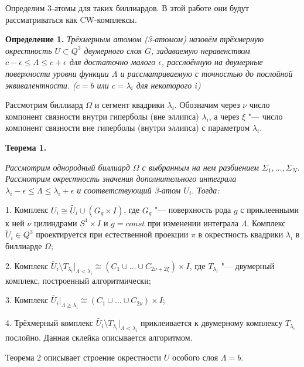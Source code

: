 Определим 3-атомы для таких биллиардов. В этой работе они будут рассматриваться как CW-комплексы.

\textbf{Определение 1.} { \it Трёхмерным атомом (3-атомом) назо\-вём трёхмерную окрестность $U \subset Q^3$ двумерного слоя $G$, зада\-ваемую неравенством $c - \epsilon \leq \Lambda \leq c + \epsilon$ для достаточно малого $\epsilon$, расслоённую на двумерные поверхности уровни функции $\Lambda$ и рассматриваемую с точностью до послойной экви\-вален\-тности. ($c = b$ или $c = \lambda_i$ для некоторого $i$)}

Рассмотрим биллиард $\Omega$ и сегмент квадрики $\lambda_i$. Обоз\-начим через $\nu$ число компонент связности внутри гиперболы (вне эллипса) $\lambda_i$, а через $\xi$ "--- число компонент связности вне гиперболы (внутри эллипса) с параметром $\lambda_i$.

\textbf{Теорема 1.}
	{\it Рассмотрим однородный биллиард $\Omega$ с выб\-ран\-ным на нем разбиением $\Sigma_1, \ldots, \Sigma_N$. Рассмотрим окрест\-ность значения дополнительного интеграла $\lambda_i - \epsilon \leq \Lambda \leq \lambda_i + \epsilon$ и соответствующий 3-атом $U_i$. Тогда:

	1. Комплекс $U_i \cong \tilde{U_i} \cup (G_g \times I)$, где $G_g$ "--- поверхность рода $g$ с приклеенными к ней $\nu$ цилиндрами $S^1 \times I$ и $g = const$ при изменении интеграла $\Lambda$. Комплекс $\tilde U_i \in Q^3$ проектируется при естественной проекции $\pi$ в окрестность квадрики $\lambda_i$ в биллиарде $\Omega$;

	2. Комплекс $\tilde{U_i} \setminus T_{\lambda_i} |_{\Lambda < \lambda_i} \cong (C_1 \cup \ldots \cup C_{2\nu+2\xi}) \times I$, где $T_{\lambda_i} $ "--- двумерный комплекс, построенный алгорит\-мически;

	3. Комплекс $\tilde{U_i} |_{\Lambda \geq \lambda_i} \cong (C_1 \cup \ldots \cup C_{2\nu}) \times I$;

	4. Трёхмерный комплекс $\tilde{U_i} \setminus T_{\lambda_i} |_{\Lambda < \lambda_i}$ прик\-леи\-вается к двумерному комплексу $T_{\lambda_i}$ послойно. Данная склей\-ка описы\-вается алгоритмом.
}

Теорема 2 описывает строение окрестности $U$ особого слоя $\Lambda = b$.

